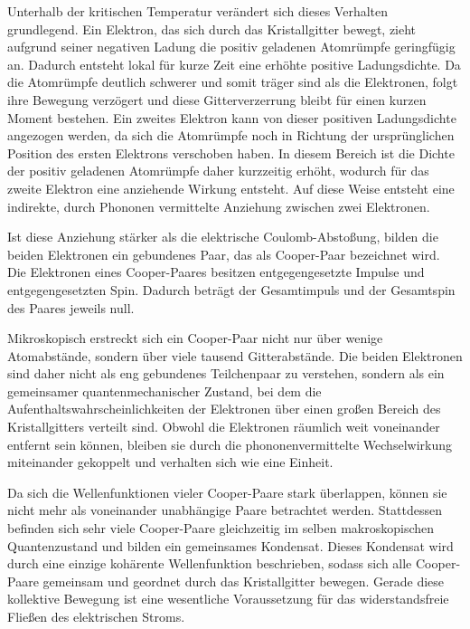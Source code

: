 \documentclass{article}
\begin{document}
Unterhalb der kritischen Temperatur verändert sich dieses Verhalten grundlegend. Ein Elektron, das sich durch das Kristallgitter bewegt, zieht aufgrund seiner negativen Ladung die positiv geladenen Atomrümpfe geringfügig an. Dadurch entsteht lokal für kurze Zeit eine erhöhte positive Ladungsdichte. Da die Atomrümpfe deutlich schwerer und somit träger sind als die Elektronen, folgt ihre Bewegung verzögert und diese Gitterverzerrung bleibt für einen kurzen Moment bestehen. Ein zweites Elektron kann von dieser positiven Ladungsdichte angezogen werden, da sich die Atomrümpfe noch in Richtung der ursprünglichen Position des ersten Elektrons verschoben haben. In diesem Bereich ist die Dichte der positiv geladenen Atomrümpfe daher kurzzeitig erhöht, wodurch für das zweite Elektron eine anziehende Wirkung entsteht. Auf diese Weise entsteht eine indirekte, durch Phononen vermittelte Anziehung zwischen zwei Elektronen.

Ist diese Anziehung stärker als die elektrische Coulomb-Abstoßung, bilden die beiden Elektronen ein gebundenes Paar, das als Cooper-Paar bezeichnet wird. Die Elektronen eines Cooper-Paares besitzen entgegengesetzte Impulse und entgegengesetzten Spin. Dadurch beträgt der Gesamtimpuls und der Gesamtspin des Paares jeweils null.

Mikroskopisch erstreckt sich ein Cooper-Paar nicht nur über wenige Atomabstände, sondern über viele tausend Gitterabstände. Die beiden Elektronen sind daher nicht als eng gebundenes Teilchenpaar zu verstehen, sondern als ein gemeinsamer quantenmechanischer Zustand, bei dem die Aufenthaltswahrscheinlichkeiten der Elektronen über einen großen Bereich des Kristallgitters verteilt sind. Obwohl die Elektronen räumlich weit voneinander entfernt sein können, bleiben sie durch die phononenvermittelte Wechselwirkung miteinander gekoppelt und verhalten sich wie eine Einheit.

Da sich die Wellenfunktionen vieler Cooper-Paare stark überlappen, können sie nicht mehr als voneinander unabhängige Paare betrachtet werden. Stattdessen befinden sich sehr viele Cooper-Paare gleichzeitig im selben makroskopischen Quantenzustand und bilden ein gemeinsames Kondensat. Dieses Kondensat wird durch eine einzige kohärente Wellenfunktion beschrieben, sodass sich alle Cooper-Paare gemeinsam und geordnet durch das Kristallgitter bewegen. Gerade diese kollektive Bewegung ist eine wesentliche Voraussetzung für das widerstandsfreie Fließen des elektrischen Stroms.
 \cite{demtroder_3} \cite{fprak_manual} \cite{wiki-superconducter} \cite{wiki-cooper}
\end{document}
